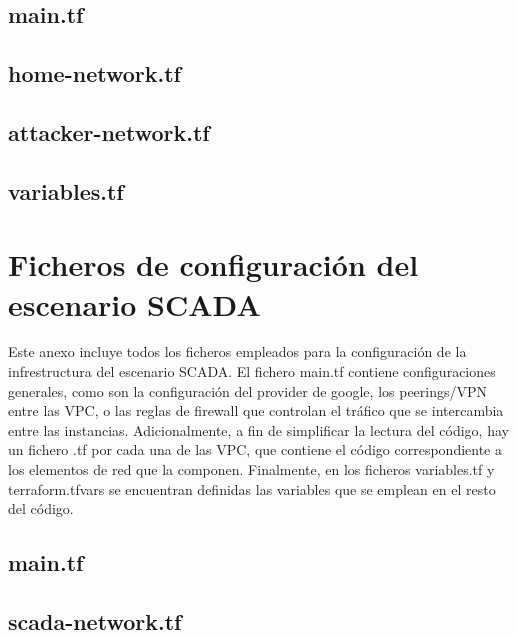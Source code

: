 \section*{main.tf} 


\section*{home-network.tf}


\section*{attacker-network.tf}


\section*{variables.tf}


\chapter{Ficheros de configuración del escenario SCADA} \label{anx:scada}
  Este anexo incluye todos los ficheros empleados para la configuración de la infrestructura del escenario SCADA. El fichero main.tf contiene configuraciones generales, como son la configuración del provider de google, los peerings/VPN entre las VPC, o las reglas de firewall que controlan el tráfico que se intercambia entre las instancias. Adicionalmente, a fin de simplificar la lectura del código, hay un fichero .tf por cada una de las VPC, que contiene el código correspondiente a los elementos de red que la componen. Finalmente, en los ficheros variables.tf y terraform.tfvars se encuentran definidas las variables que se emplean en el resto del código.

\section*{main.tf} 


\section*{scada-network.tf}


